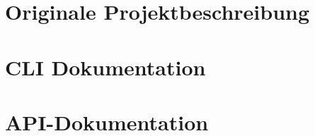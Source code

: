\documentclass[a4paper,12pt]{report}
\begin{document}
    \vspace*{\fill}
    \thispagestyle{empty}
    \titleformat{\section}{\centering\normalfont\Large\bfseries}{\thesection}{1em}{}


    \section{Originale Projektbeschreibung}\label{sec:originale-projektbeschreibung}
    \vspace*{\fill}
    


    \vspace*{\fill}
    \thispagestyle{empty}
    \titleformat{\section}{\centering\normalfont\Large\bfseries}{\thesection}{1em}{}


    \section{CLI Dokumentation}\label{sec:cli-doc}
    \vspace*{\fill}
    

    \vspace*{\fill}
    \thispagestyle{empty}
    \titleformat{\section}{\centering\normalfont\Large\bfseries}{\thesection}{1em}{}


    \section{API-Dokumentation}\label{sec:api-spec}
    \vspace*{\fill}
    

    \vspace*{\fill}
    \thispagestyle{empty}
    \titleformat{\section}{\centering\normalfont\Large\bfseries}{\thesection}{1em}{}
\end{document}
